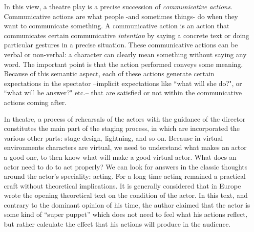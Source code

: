 \documentclass[
		twoside,openright,titlepage,numbers=noenddot,manychapters,
		headinclude,%
                footinclude=false,cleardoublepage=empty,
                BCOR=5mm,
		fontsize=11pt, %
                 enabledeprecatedfontcommands]{scrreprt}
\begin{document}
In this view, a theatre play is a precise succession of \emph{communicative actions}.  Communicative actions are what people -and sometimes things- do when they want to communicate something. A communicative action is an action that communicates certain communicative \emph{intention} by saying a concrete text or doing particular gestures  in a precise situation. %
These communicative actions can be verbal or  non-verbal: a character can clearly mean something without saying any word. The important point is that the action performed conveys some meaning. Because of this semantic aspect, each of these actions generate certain expectations in the spectator --implicit expectations like ``what will she do?", or ``what will he answer?" etc.-- that are satisfied or not within the communicative actions coming after. 

In theatre, a process of rehearsals of the actors with the guidance of the director constitutes the main part of the staging process, in which are incorporated the various other parts: stage design, lightning, and so on. Because in virtual environments characters are virtual, we need to understand what makes an actor a good one, to then know what will make a good virtual actor. What does an actor need to do to act properly?  We can look for answers in the classic thoughts around the actor's speciality: acting. For a long time acting remained a practical craft without theoretical implications. It is generally considered that in Europe \cite{diderot1902paradoxe} wrote the opening theoretical text on the condition of the actor. In this text, and contrary to the dominant opinion of his time, the author claimed that the actor is some kind of ``super puppet'' which does not  need to feel what his actions reflect, but rather calculate the effect that his actions will produce in the audience. 
\end{document}
